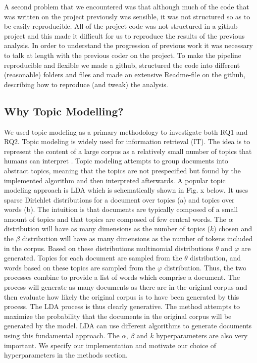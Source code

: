 \documentclass{article}
\begin{document}
A second problem that we encountered was that although much of the code that was written on the project previously was sensible, it was not structured so as to be easily reproducible. All of the project code was not structured in a github project and this made it difficult for us to reproduce the results of the previous analysis. In order to understand the progression of previous work it was necessary to talk at length with the previous coder on the project. To make the pipeline reproducible and flexible we made a github, structured the code into different (reasonable) folders and files and made an extensive Readme-file on the github, describing how to reproduce (and tweak) the analysis.

    \subsection{Why Topic Modelling?}
    We used topic modeling as a primary methodology to investigate both RQ1 and RQ2. Topic modeling is widely used for information retrieval (IT). The idea is to represent the content of a large corpus as a relatively small number of topics that humans can interpret \cite{arun2010finding}. Topic modeling attempts to group documents into abstract topics, meaning that the topics are not prespecified but found by the implemented algorithm and then interpreted afterwards. 
A popular topic modeling approach is LDA \cite{arun2010finding,cao2009density} which is schematically shown in Fig. x below. It uses sparse Dirichlet distributions for a document over topics (a) and topics over words (b). The intuition is that documents are typically composed of a small amount of topics and that topics are composed of few central words. The $\alpha$ distribution will have as many dimensions as the number of topics ($k$) chosen and the $\beta$ distribution will have as many dimensions as the number of tokens included in the corpus. Based on these distributions multinomial distributions $\theta$ and $\varphi$ are generated. Topics for each document are sampled from the $\theta$ distribution, and words based on these topics are sampled from the $\varphi$ distribution. Thus, the two processes combine to provide a list of words which comprise a document. The process will generate as many documents as there are in the original corpus and then evaluate how likely the original corpus is to have been generated by this process. The LDA process is thus clearly generative. The method attempts to maximize the probability that the documents in the original corpus will be generated by the model. 
LDA can use different algorithms to generate documents using this fundamental approach. The $\alpha$, $\beta$ and $k$ hyperparameters are also very important. We specify our implementation and motivate our choice of hyperparameters in the methods section. 
\end{document}
